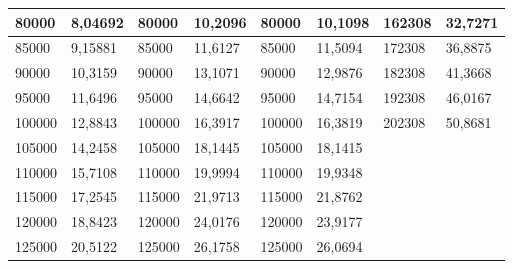 \documentclass[11pt]{article}
\begin{document}
\begin{table}[!ht]
\begin{tabular}{|l|l|l|l|l|l|l|l|}
        80000 & 8,04692 & 80000 & 10,2096 & 80000 & 10,1098 & 162308 & 32,7271 \\ \hline
        85000 & 9,15881 & 85000 & 11,6127 & 85000 & 11,5094 & 172308 & 36,8875 \\ \hline
        90000 & 10,3159 & 90000 & 13,1071 & 90000 & 12,9876 & 182308 & 41,3668 \\ \hline
        95000 & 11,6496 & 95000 & 14,6642 & 95000 & 14,7154 & 192308 & 46,0167 \\ \hline
        100000 & 12,8843 & 100000 & 16,3917 & 100000 & 16,3819 & 202308 & 50,8681 \\ \hline
        105000 & 14,2458 & 105000 & 18,1445 & 105000 & 18,1415 & ~ & ~ \\ \hline
        110000 & 15,7108 & 110000 & 19,9994 & 110000 & 19,9348 & ~ & ~ \\ \hline
        115000 & 17,2545 & 115000 & 21,9713 & 115000 & 21,8762 & ~ & ~ \\ \hline
        120000 & 18,8423 & 120000 & 24,0176 & 120000 & 23,9177 & ~ & ~ \\ \hline
        125000 & 20,5122 & 125000 & 26,1758 & 125000 & 26,0694 & ~ & \\\hline
    \end{tabular}
\end{table}
\end{document}
